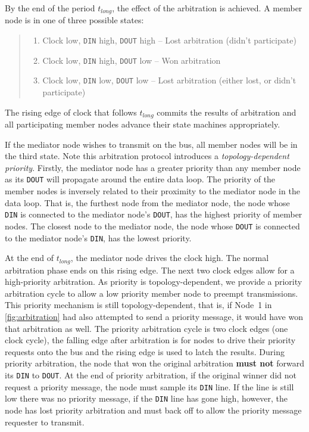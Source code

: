 By the end of the period $t_{long}$, the effect of the arbitration is
achieved. A member node is in one of three possible states:

\begin{quote}
\begin{enumerate}
  \item Clock low, {\tt DIN} high, {\tt DOUT} high -- Lost arbitration
    (didn't participate)
  \item Clock low, {\tt DIN} high, {\tt DOUT} low -- Won arbitration
  \item Clock low, {\tt DIN} low, {\tt DOUT} low -- Lost arbitration
    (either lost, or didn't participate)
\end{enumerate}
\end{quote}

\noindent
The rising edge of clock that follows $t_{long}$ commits the results of
arbitration and all participating member nodes advance their state machines
appropriately.

If the mediator node wishes to transmit on the bus, all member nodes will be in
the third state. Note this arbitration protocol introduces a {\em
topology-dependent priority}. Firstly, the mediator node has a greater priority
than any member node as its {\tt DOUT} will propagate around the entire data
loop. The priority of the member nodes is inversely related to their proximity
to the mediator node in the data loop. That is, the furthest node from the
mediator node, the node whose {\tt DIN} is connected to the mediator node's
{\tt DOUT}, has the highest priority of member nodes. The closest node to the
mediator node, the node whose {\tt DOUT} is connected to the mediator node's
{\tt DIN}, has the lowest priority.

At the end of $t_{long}$, the mediator node drives the clock high. The
normal arbitration phase ends on this rising edge. The next two clock edges
allow for a high-priority arbitration. As \bus priority is topology-dependent,
we provide a priority arbitration cycle to allow a low priority member node to
preempt transmissions. This priority mechanism is still topology-dependent,
that is, if Node~1 in \cref{fig:arbitration} had also attempted to send
a priority message, it would have won that arbitration as well. The priority
arbitration cycle is two clock edges (one clock cycle), the falling edge after
arbitration is for nodes to drive their priority requests onto the bus and the
rising edge is used to latch the results.  During priority arbitration, the
node that won the original arbitration {\bf must not} forward its {\tt DIN} to
{\tt DOUT}. At the end of priority
arbitration, if the original winner did not request a priority message, the
node must sample its {\tt DIN} line. If the line is still low there was no
priority message, if the {\tt DIN} line has gone high, however, the node
has lost priority arbitration and must back off to allow the priority message
requester to transmit.

